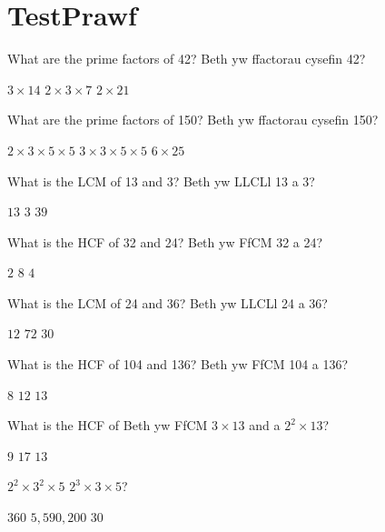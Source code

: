 
\section{\en Test\cy Prawf}
\label{sec:prime-factors-test}

\begin{questions}
\question
\en What are the prime factors of 42?
\cy Beth yw ffactorau cysefin 42?
\bi
\begin{choices}
\choice $3\times 14$
\correctchoice $2\times 3\times 7$
\choice $2\times 21$
\end{choices}

\question
\en What are the prime factors of 150?
\cy Beth yw ffactorau cysefin 150?
\bi
\begin{choices}
\correctchoice $2\times 3\times 5\times 5$
\choice $3\times 3\times 5\times 5$
\choice $6\times 25$
\end{choices}

\question
\en What is the LCM of 13 and 3?
\cy Beth yw LLCLl 13 a 3?
\bi
\begin{choices}
\choice $13$
\choice $3$
\correctchoice $39$
\end{choices}

\question
\en What is the HCF of 32 and 24?
\cy Beth yw FfCM 32 a 24?
\bi
\begin{choices}
\choice $2$
\correctchoice $8$
\choice $4$
\end{choices}

\question
\en What is the LCM of 24 and 36?
\cy Beth yw LLCLl 24 a 36?
\bi
\begin{choices}
\choice $12$
\correctchoice $72$
\choice $30$
\end{choices}

\question
\en What is the HCF of 104 and 136?
\cy Beth yw FfCM 104 a 136?
\bi
\begin{choices}
\correctchoice $8$
\choice $12$
\choice $13$
\end{choices}

\question
\en What is the HCF of 
\cy Beth yw FfCM 
$3\times 13$ 
\en and \cy a 
$2^2\times 13$?
\begin{choices}
\choice $9$
\choice $17$
\correctchoice $13$
\end{choices}

\question
{} $2^2\times 3^2\times 5$ 
 $2^3\times 3\times 5$?
\begin{choices}
\correctchoice $360$
\choice $5,590,200$
\choice $30$
\end{choices}


\end{questions}
